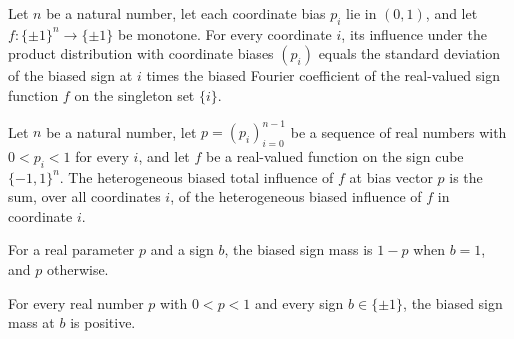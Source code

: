 \begin{theorem}
\label{FABL.heterogeneousBiasedInfluence_eq_sigma_mul_singletonCoeff_of_monotone}
\leanok
{}
Let $n$ be a natural number, let each coordinate bias $p_i$ lie in $(0,1)$, and let
$f:\{\pm1\}^n\to\{\pm1\}$ be monotone. For every coordinate $i$, its influence under the
product distribution with coordinate biases $(p_i)$ equals the standard deviation of the
biased sign at $i$ times the biased Fourier coefficient of the real-valued sign function
$f$ on the singleton set $\{i\}$.
\end{theorem}

\begin{definition}
\label{FABL.heterogeneousBiasedTotalInfluence}
\leanok
{}
Let $n$ be a natural number, let $p=(p_i)_{i=0}^{n-1}$ be a sequence of real numbers
with $0<p_i<1$ for every $i$, and let $f$ be a real-valued function on the sign cube
$\{-1,1\}^n$. The heterogeneous biased total influence of $f$ at bias vector $p$ is the
sum, over all coordinates $i$, of the heterogeneous biased influence of $f$ in
coordinate $i$.
\end{definition}

\begin{definition}
\label{FABL.biasedSignMass}
\leanok
{}
For a real parameter $p$ and a sign $b$, the biased sign mass is $1-p$ when $b=1$, and
$p$ otherwise.
\end{definition}

\begin{theorem}
\label{FABL.biasedSignMass_pos}
\leanok
{}
For every real number $p$ with $0<p<1$ and every sign $b\in\{\pm1\}$, the biased sign
mass at $b$ is positive.
\end{theorem}

